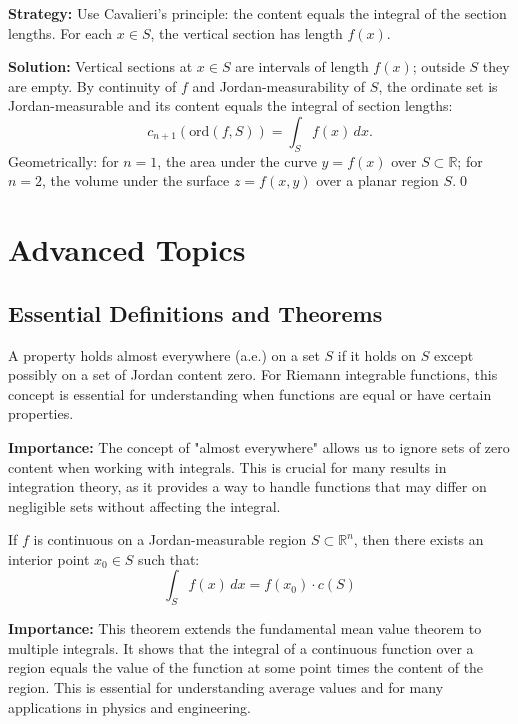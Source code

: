 \noindent\textbf{Strategy:} Use Cavalieri's principle: the content equals the integral of the section lengths. For each $x\in S$, the vertical section has length $f(x)$.

\bigskip\noindent\textbf{Solution:}
Vertical sections at $x\in S$ are intervals of length $f(x)$; outside $S$ they are empty. By continuity of $f$ and Jordan-measurability of $S$, the ordinate set is Jordan-measurable and its content equals the integral of section lengths:
\[ c_{n+1}(\text{ord}(f,S)) = \int_S f(x)\,dx. \]
Geometrically: for $n=1$, the area under the curve $y=f(x)$ over $S\subset\mathbb R$; for $n=2$, the volume under the surface $z=f(x,y)$ over a planar region $S$.\qed
\section{Advanced Topics}

\subsection*{Essential Definitions and Theorems}

\begin{definition}
A property holds almost everywhere (a.e.) on a set $S$ if it holds on $S$ except possibly on a set of Jordan content zero. For Riemann integrable functions, this concept is essential for understanding when functions are equal or have certain properties.
\end{definition}

\noindent\textbf{Importance:} The concept of "almost everywhere" allows us to ignore sets of zero content when working with integrals. This is crucial for many results in integration theory, as it provides a way to handle functions that may differ on negligible sets without affecting the integral.



\begin{theorem}
If $f$ is continuous on a Jordan-measurable region $S \subset \mathbb{R}^n$, then there exists an interior point $x_0 \in S$ such that:
\[\int_S f(x) \, dx = f(x_0) \cdot c(S)\]
\end{theorem}

\noindent\textbf{Importance:} This theorem extends the fundamental mean value theorem to multiple integrals. It shows that the integral of a continuous function over a region equals the value of the function at some point times the content of the region. This is essential for understanding average values and for many applications in physics and engineering.



